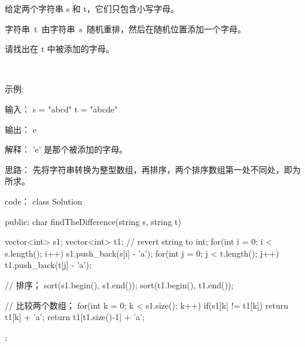 给定两个字符串 s 和 t，它们只包含小写字母。

字符串 t 由字符串 s 随机重排，然后在随机位置添加一个字母。

请找出在 t 中被添加的字母。

 

示例:

输入：
s = "abcd"
t = "abcde"

输出：
e

解释：
'e' 是那个被添加的字母。




















思路：
先将字符串转换为整型数组，再排序，两个排序数组第一处不同处，即为所求。


























code：
class Solution {
public:
    char findTheDifference(string s, string t) {
        vector<int> s1;
        vector<int> t1;
        // revert string to int;
        for(int i = 0; i < s.length(); i++)
        {
            s1.push_back(s[i] - 'a');
        }
        for(int j = 0; j < t.length(); j++)
        {
            t1.push_back(t[j] - 'a');
        }
        
         // 排序；
        sort(s1.begin(), s1.end());
        sort(t1.begin(), t1.end());
        
         // 比较两个数组；
        for(int k = 0; k < s1.size(); k++)
        {
            if(s1[k] != t1[k]) return t1[k] + 'a';
        }
        return t1[t1.size()-1] + 'a';
    }
};